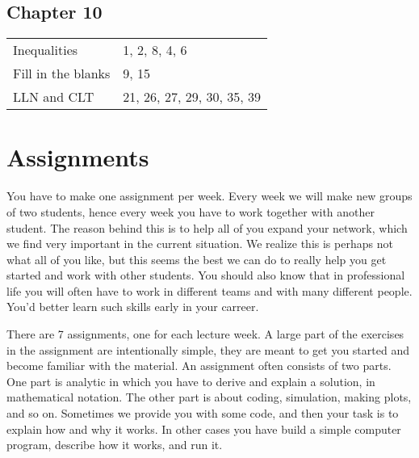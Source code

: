 \documentclass[a4paper]{article}
\theoremstyle{definition}
\newcommand{\1}[1]{\,I_{#1}} %
\begin{document}
\subsection{Chapter 10}
\label{sec:orga4975b3}
\begin{center}
\begin{tabular}{ll}
\hline
Inequalities & 1, 2, 8, 4, 6\\
Fill in the blanks & 9, 15\\
LLN and CLT & 21, 26, 27, 29, 30, 35, 39\\
\hline
\end{tabular}
\end{center}


\section{Assignments}
\label{sec:orgc2b2d1c}
You have to make one assignment per week.
Every week we will make new groups of two students, hence every week you have to work together with another student.
The reason behind this is to help all of you expand your network, which we find very important in the current situation.
We realize this is perhaps not what all of you like, but this seems the best we can do to really help you get started and work with other students.
You should also know that in professional life you will often have to work in different teams and with many different people.
You'd better learn such skills early in your carreer.

There are 7 assignments, one for each lecture week.
A large part of the exercises in the assignment are intentionally simple, they are meant to get you started and become familiar with the material.
An assignment often consists of two parts.
One part is analytic in which you have to derive and explain a solution, in mathematical notation.
The other part is about coding, simulation, making plots, and so on.
Sometimes  we provide you with some code, and then your task is to explain how and why it works.
In other cases you have build a simple computer program, describe how it works, and run it.
\end{document}
